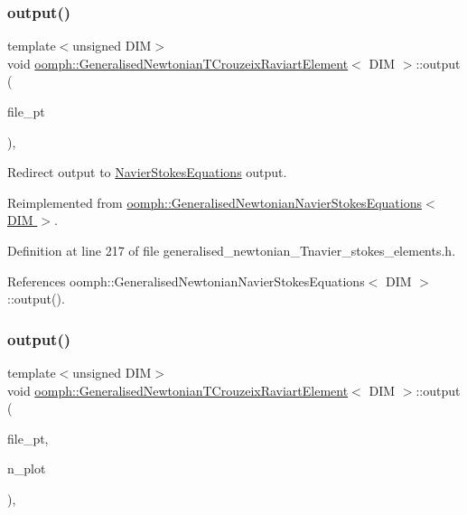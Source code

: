 \subsubsection{\texorpdfstring{output()}{output()}\hspace{0.1cm}{\footnotesize\ttfamily [3/4]}}
{\footnotesize\ttfamily template$<$unsigned D\+IM$>$ \\
void \hyperlink{classoomph_1_1GeneralisedNewtonianTCrouzeixRaviartElement}{oomph\+::\+Generalised\+Newtonian\+T\+Crouzeix\+Raviart\+Element}$<$ D\+IM $>$\+::output (\begin{DoxyParamCaption}\item[{F\+I\+LE $\ast$}]{file\+\_\+pt }\end{DoxyParamCaption})\hspace{0.3cm}{\ttfamily [inline]}, {\ttfamily [virtual]}}



Redirect output to \hyperlink{classoomph_1_1NavierStokesEquations}{Navier\+Stokes\+Equations} output. 



Reimplemented from \hyperlink{classoomph_1_1GeneralisedNewtonianNavierStokesEquations_a0f56934ff2c1092a8e9bc457c93bf8cb}{oomph\+::\+Generalised\+Newtonian\+Navier\+Stokes\+Equations$<$ D\+I\+M $>$}.



Definition at line 217 of file generalised\+\_\+newtonian\+\_\+\+Tnavier\+\_\+stokes\+\_\+elements.\+h.



References oomph\+::\+Generalised\+Newtonian\+Navier\+Stokes\+Equations$<$ D\+I\+M $>$\+::output().

\mbox{\label{classoomph_1_1GeneralisedNewtonianTCrouzeixRaviartElement_a5cd44245b4ad4ecbf6179be6068d37ea}} 
\subsubsection{\texorpdfstring{output()}{output()}\hspace{0.1cm}{\footnotesize\ttfamily [4/4]}}
{\footnotesize\ttfamily template$<$unsigned D\+IM$>$ \\
void \hyperlink{classoomph_1_1GeneralisedNewtonianTCrouzeixRaviartElement}{oomph\+::\+Generalised\+Newtonian\+T\+Crouzeix\+Raviart\+Element}$<$ D\+IM $>$\+::output (\begin{DoxyParamCaption}\item[{F\+I\+LE $\ast$}]{file\+\_\+pt,  }\item[{const unsigned \&}]{n\+\_\+plot }\end{DoxyParamCaption})\hspace{0.3cm}{\ttfamily [inline]}, {\ttfamily [virtual]}}



